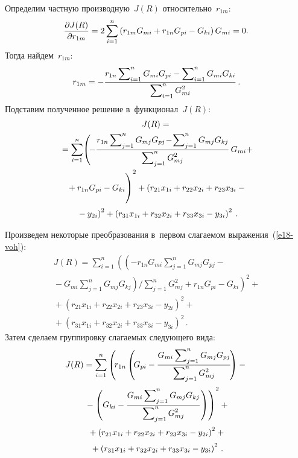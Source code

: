 \begin{multicols}{2}
  Определим частную производную~$J(R)$ относительно~$r_{1m}$:
  \begin{equation*}
  \hspace*{-1.63478pt}\displaystyle\frac{\displaystyle \partial J(R)\mathstrut}{\displaystyle \partial r_{1m}\mathstrut} =2\sum\limits^n_{i=1} \left( 
r_{1{m}}G_{mi} +r_{1{n}}G_{pi} -G_{ki}\right) G_{mi}=0.
  \end{equation*}
  Тогда найдем~$r_{1{m}}$:
  $$
  r_{1{m}}= -\displaystyle\frac{\displaystyle r_{1n}\sum\nolimits^n_{i=1} G_{mi} G_{pi}-
\sum\nolimits^n_{i=1} G_{mi} G_{ki}\mathstrut}{\displaystyle \sum\nolimits^n_{i=1} G_{mi}^2\mathstrut}\,.
  $$
  Подставим полученное решение в~функционал~$J(R)$:
  \begin{multline}
  J(R)={}\\
  {}=\sum\limits^n_{i=1} \!\left(\! -\fr{r_{1{n}}\sum\nolimits^n_{j=1} 
G_{mj} G_{pj} \!-\!\sum\nolimits^n_{j=1} G_{mj} G_{kj}} {\sum\nolimits^n_{j=1} 
G_{mj}^2}\,G_{mi} +\right.\\
\left.{}+r_{1n}G_{pi} -G_{ki}
\vphantom{\fr{r_{1\mathrm{n}}\sum\nolimits^n_{j=1} 
G_{mj} G_{pj} -\sum\nolimits^n_{j=1} G_{mj} G_{kj}} {\sum\nolimits^n_{j=1} 
G_{mj}^2}}
\right)^2+
 \left( r_{21}x_{1i} +r_{22}x_{2i} + r_{23}x_{3i}-{}\right.\\
\left. {}-y_{2i}\right)^2+ \left( r_{31}x_{1i} +r_{32}x_{2i} +r_{33}x_{3i}-y_{3i}\right)^2\,.
  \label{e18-voh}
  \end{multline}
  
  Произведем некоторые преобразования в~первом сла\-га\-емом 
выражения~(\ref{e18-voh}):
  \begin{multline*}
  J(R)=\sum\limits^n_{i=1}
  \left(  \left(
  - r_{1{n}} G_{mi} 
\sum\limits^n_{j=1} G_{mj} G_{pj} -{}\right.\right.\\
\left.\left.{}-G_{mi} \sum\limits^n_{j=1} G_{mj} 
G_{kj}\!\right) \!\Bigg/\!  \sum\limits^n_{j=1} G_{mj}^2+
r_{1n} G_{pi} -G_{ki}\!\right)^2\!\!+\\
  {}+
  \left( r_{21}x_{1i} +r_{22}x_{2i} +r_{23}x_{3i}-y_{2i}\right)^2+{}\\
  {}+ \left( r_{31}x_{1i} +r_{32}x_{2i} +r_{33}x_{3i}-y_{3i}\right)^2\,.
  \end{multline*}
  Затем сделаем группировку слагаемых сле\-ду\-юще\-го вида:
  \begin{multline}
  J(R)= \sum\limits^n_{i=1} \left(\! r_{1n}\left(\! G_{pi} -\displaystyle\frac{\displaystyle G_{mi} 
\sum\nolimits^n_{j=1} G_{mj} G_{pj}\mathstrut}{\displaystyle \sum\nolimits^n_{j=1} G_{mj}^2\mathstrut} 
\!\right)-{}\right.\\[2pt]
  \left.{}-\left( G_{ki} -\displaystyle\frac{\displaystyle  G_{mi} \sum\nolimits^n_{j=1} G_{mj} G_{kj}\mathstrut}{\displaystyle  
\sum\nolimits^n_{j=1} G_{mj}^2\mathstrut}\right) \right)^2+{}\\[2pt]
  {}+ \left( r_{21}x_{1i} +r_{22}x_{2i} +r_{23}x_{3i}-y_{2i}\right)^2+{}\\[2pt]
  {}+ \left( r_{31}x_{1i} +r_{32}x_{2i} +r_{33}x_{3i}-y_{3i}\right)^2\,.
  \label{e20-voh}
  \end{multline}
  

\end{multicols}
